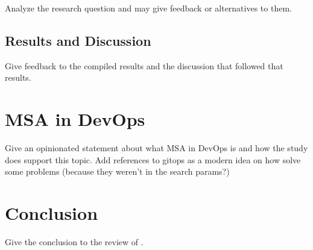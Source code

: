 Analyze the research question and may give feedback or alternatives to them.

\subsection{Results and Discussion}

Give feedback to the compiled results and the discussion that followed
that results.

\section{MSA in DevOps}

Give an opinionated statement about what MSA in DevOps is and how the study
does support this topic.
Add references to gitops as a modern idea on how solve some problems (because
they weren't in the search params?)



\section{Conclusion}

Give the conclusion to the review of \cite{waseem:SMS}.
